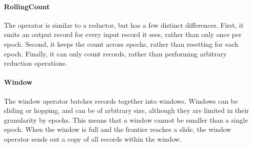 \paragraph{RollingCount}
The  operator is similar to a reductor, but has a few distinct differences. First, it emits an output record for every input record it sees, rather than only once per epoch. Second, it keeps the count across epochs, rather than resetting for each epoch. Finally, it can only count records, rather than performing arbitrary reduction operations.

\paragraph{Window}
The window operator batches records together into windows. Windows can be sliding or hopping, and can be of arbitrary size, although they are limited in their granularity by epochs. This means that a window cannot be smaller than a single epoch. When the window is full and the frontier reaches a slide, the window operator sends out a copy of all records within the window.

